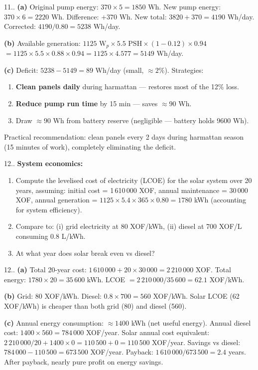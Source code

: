 \documentclass[12pt,a4paper,openany]{book}
\newcounter{exoctr}[chapter]
\renewcommand{\theexoctr}{\thechapter.\arabic{exoctr}}
\begin{document}
\begin{solbox}{11.\theexoctr}
\textbf{(a)} Original pump energy: $370\times5=1850$ Wh. New pump energy: $370\times6=2220$ Wh. Difference: $+370$ Wh. New total: $3820+370=4190$ Wh/day. Corrected: $4190/0.80=5238$ Wh/day.

\textbf{(b)} Available generation: $1125\text{ W}_p\times5.5\text{ PSH}\times(1-0.12)\times0.94$
$=1125\times5.5\times0.88\times0.94=1125\times4.577=5149$ Wh/day.

\textbf{(c)} Deficit: $5238-5149=89$ Wh/day (small, $\approx2\%$). Strategies:
\begin{enumerate}[label=\roman*.]
  \item \textbf{Clean panels daily} during harmattan — restores most of the 12\% loss.
  \item \textbf{Reduce pump run time} by 15 min — saves $\approx90$ Wh.
  \item Draw $\approx90$ Wh from battery reserve (negligible — battery holds 9600 Wh).
\end{enumerate}
Practical recommendation: clean panels every 2 days during harmattan season (15 minutes of work), completely eliminating the deficit.
\end{solbox}

\begin{exobox}{12.\theexoctr}
\textbf{System economics:} 
\begin{enumerate}[label=(\alph*)]
  \item Compute the levelised cost of electricity (LCOE) for the solar system over 20 years, assuming: initial cost = 1\,610\,000 XOF, annual maintenance = 30\,000 XOF, annual generation = $1125\times5.4\times365\times0.80=1780$ kWh (accounting for system efficiency).
  \item Compare to: (i) grid electricity at 80 XOF/kWh, (ii) diesel at 700 XOF/L consuming 0.8 L/kWh.
  \item At what year does solar break even vs diesel?
\end{enumerate}
\end{exobox}

\begin{solbox}{12.\theexoctr}
\textbf{(a)} Total 20-year cost: $1\,610\,000 + 20\times30\,000 = 2\,210\,000$ XOF.
Total energy: $1780\times20=35\,600$ kWh.
LCOE $= 2\,210\,000/35\,600 = \mathbf{62.1}$ XOF/kWh.

\textbf{(b)} Grid: 80 XOF/kWh. Diesel: $0.8\times700=560$ XOF/kWh.
Solar LCOE (62 XOF/kWh) is cheaper than both grid (80) and diesel (560).

\textbf{(c)} Annual energy consumption: $\approx1400$ kWh (net useful energy). Annual diesel cost: $1400\times560=784\,000$ XOF/year. Solar annual cost equivalent: $2\,210\,000/20+1400\times0=110\,500+0=110\,500$ XOF/year. 
Savings vs diesel: $784\,000-110\,500=673\,500$ XOF/year. 
Payback: $1\,610\,000/673\,500=\mathbf{2.4}$ years. After payback, nearly pure profit on energy savings.
\end{solbox}
\end{document}
